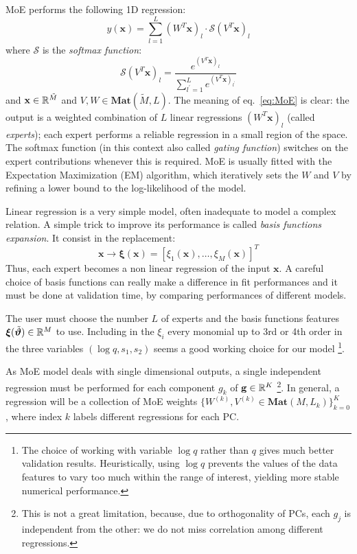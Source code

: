 MoE performs the following 1D regression:
\begin{equation} \label{eq:MoE}
	y(\mathbf{x}) = \sum_{l=1}^L (W^T \mathbf{x})_l \cdot \mathcal{S}(V^T\mathbf{x})_l
\end{equation}
where $\mathcal{S}$ is the \textit{softmax function}:
\begin{equation} \label{eq:softmax}
	\mathcal{S}(V^T{\mathbf{x}})_l = \frac{e^{(V^T{\mathbf{x}})_l}}{\sum_{l^\prime = 1}^L e^{(V^T{\mathbf{x}})_{l^\prime}}}
\end{equation}
and ${\mathbf{x}} \in \mathbb{R}^{\tilde{M}}$ and $V,W \in \mathbf{Mat}(\tilde{M},L)$.
The meaning of eq.~\eqref{eq:MoE} is clear: the output is a weighted combination of $L$ linear regressions $(W^T \mathbf{x})_l$ (called \textit{experts}); each expert performs a reliable regression in a small region of the space. The softmax function (in this context also called \textit{gating function}) switches on the expert contributions whenever this is required.
MoE is usually fitted with the Expectation Maximization (EM) algorithm, which iteratively sets the $W$ and $V$ by refining a lower bound to the log-likelihood of the model.

Linear regression is a very simple model, often inadequate to model a complex relation. A simple trick to improve its performance is called \textit{basis functions expansion}. It consist in the replacement:
\begin{equation}
	{\mathbf{x}} \longrightarrow {\boldsymbol{\xi}}({\mathbf{x}}) = [\xi_1({\mathbf{x}}), \ldots, \xi_M({\mathbf{x}})]^T
\end{equation}
Thus, each expert becomes a non linear regression of the input ${\mathbf{x}}$.
A careful choice of basis functions can really make a difference in fit performances and it must be done at validation time, by comparing performances of different models.

The user must choose the number $L$ of experts and the basis functions features ${\boldsymbol{\xi}}({\tilde{\boldsymbol{\vartheta}}}) \in \mathbb{R}^{M}$ to use.
Including in the $\xi_i$ every monomial up to 3rd or 4th order in the three variables $ (\log q, s_1, s_2)$ seems a good working choice for our model
\footnote{
The choice of working with variable $\log q$ rather than $q$ gives much better validation results.
Heuristically, using $\log q$ prevents the values of the data features to vary too much within the range of interest, yielding more stable numerical performance.
}.

As MoE model deals with single dimensional outputs, a single independent regression must be performed for each component $g_k$ of $\mathbf{g} \in \mathbb{R}^K$
\footnote{This is not a great limitation, because, due to orthogonality of PCs, each $g_j$ is independent from the other: we do not miss correlation among different regressions.}.
In general, a regression will be a collection of MoE weights ${\{ W^{(k)}, V^{(k)} \in \mathbf{Mat}(M,L_k) \}_{k=0}^K}$, where index $k$ labels different regressions for each PC.

